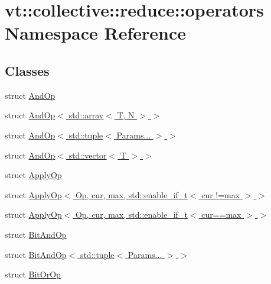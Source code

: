 \hypertarget{namespacevt_1_1collective_1_1reduce_1_1operators}{}\section{vt\+:\+:collective\+:\+:reduce\+:\+:operators Namespace Reference}
\label{namespacevt_1_1collective_1_1reduce_1_1operators}
\subsection*{Classes}
\begin{DoxyCompactItemize}
\item 
struct \hyperlink{structvt_1_1collective_1_1reduce_1_1operators_1_1_and_op}{And\+Op}
\item 
struct \hyperlink{structvt_1_1collective_1_1reduce_1_1operators_1_1_and_op_3_01std_1_1array_3_01_t_00_01_n_01_4_01_4}{And\+Op$<$ std\+::array$<$ T, N $>$ $>$}
\item 
struct \hyperlink{structvt_1_1collective_1_1reduce_1_1operators_1_1_and_op_3_01std_1_1tuple_3_01_params_8_8_8_01_4_01_4}{And\+Op$<$ std\+::tuple$<$ Params... $>$ $>$}
\item 
struct \hyperlink{structvt_1_1collective_1_1reduce_1_1operators_1_1_and_op_3_01std_1_1vector_3_01_t_01_4_01_4}{And\+Op$<$ std\+::vector$<$ T $>$ $>$}
\item 
struct \hyperlink{structvt_1_1collective_1_1reduce_1_1operators_1_1_apply_op}{Apply\+Op}
\item 
struct \hyperlink{structvt_1_1collective_1_1reduce_1_1operators_1_1_apply_op_3_01_op_00_01cur_00_01max_00_01std_1_937201b57e5f1198bb3aecf49733237f}{Apply\+Op$<$ Op, cur, max, std\+::enable\+\_\+if\+\_\+t$<$ cur !=max $>$ $>$}
\item 
struct \hyperlink{structvt_1_1collective_1_1reduce_1_1operators_1_1_apply_op_3_01_op_00_01cur_00_01max_00_01std_1_2d6ca6d223c0efb94ecae2d0b534fc8c}{Apply\+Op$<$ Op, cur, max, std\+::enable\+\_\+if\+\_\+t$<$ cur==max $>$ $>$}
\item 
struct \hyperlink{structvt_1_1collective_1_1reduce_1_1operators_1_1_bit_and_op}{Bit\+And\+Op}
\item 
struct \hyperlink{structvt_1_1collective_1_1reduce_1_1operators_1_1_bit_and_op_3_01std_1_1tuple_3_01_params_8_8_8_01_4_01_4}{Bit\+And\+Op$<$ std\+::tuple$<$ Params... $>$ $>$}
\item 
struct \hyperlink{structvt_1_1collective_1_1reduce_1_1operators_1_1_bit_or_op}{Bit\+Or\+Op}

\end{DoxyCompactItemize}
